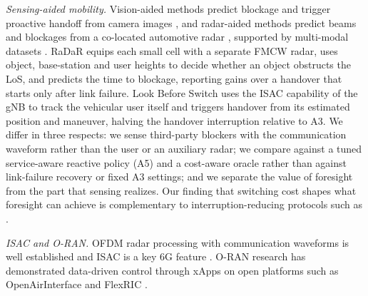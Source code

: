\documentclass[conference]{IEEEtran}
\begin{document}
\textit{Sensing-aided mobility.} Vision-aided methods predict blockage
and trigger proactive handoff from camera images
\cite{charan2021vision}, and radar-aided methods predict beams and
blockages from a co-located automotive radar
\cite{demirhan2022radar,demirhan2022radarblockage}, supported by
multi-modal datasets \cite{alkhateeb2023deepsense}. RaDaR
\cite{alquraan2023radar} equips each small cell with a separate FMCW
radar, uses object, base-station and user heights to decide whether an
object obstructs the LoS, and predicts the time to blockage, reporting
gains over a handover that starts only after link failure. Look Before
Switch \cite{li2025lookbefore} uses the ISAC capability of the gNB to
track the vehicular user itself and triggers handover from its estimated
position and maneuver, halving the handover interruption relative to A3.
We differ in three respects: we sense third-party blockers with the
communication waveform rather than the user or an auxiliary radar; we
compare against a tuned service-aware reactive policy (A5) and a
cost-aware oracle rather than against link-failure recovery or fixed A3
settings; and we separate the value of foresight from the part that
sensing realizes. Our finding that switching cost shapes what foresight
can achieve is complementary to interruption-reducing protocols such as
\cite{li2025lookbefore}.

\textit{ISAC and O-RAN.} OFDM radar processing with communication
waveforms is well established \cite{sturm2011ofdm} and ISAC is a key 6G
feature \cite{liu2022isac}. O-RAN research has demonstrated data-driven
control through xApps \cite{polese2023oran,bonati2021intelligence} on
open platforms such as OpenAirInterface and FlexRIC
\cite{nikaein2014oai,schmidt2021flexric}.

\end{document}
